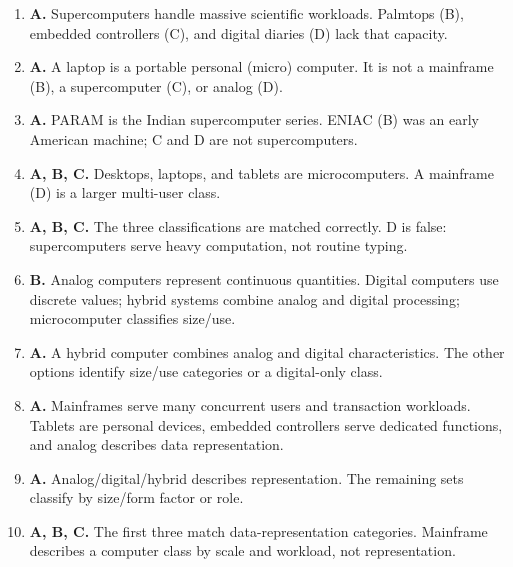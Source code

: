 \begin{enumerate}[label=\textbf{Q\arabic*.}, leftmargin=*]
\item \textbf{A.} Supercomputers handle massive scientific workloads. Palmtops (B), embedded controllers (C), and digital diaries (D) lack that capacity.
\item \textbf{A.} A laptop is a portable personal (micro) computer. It is not a mainframe (B), a supercomputer (C), or analog (D).
\item \textbf{A.} PARAM is the Indian supercomputer series. ENIAC (B) was an early American machine; C and D are not supercomputers.
\item \textbf{A, B, C.} Desktops, laptops, and tablets are microcomputers. A mainframe (D) is a larger multi-user class.
\item \textbf{A, B, C.} The three classifications are matched correctly. D is false: supercomputers serve heavy computation, not routine typing.
\item \textbf{B.} Analog computers represent continuous quantities. Digital computers use discrete values; hybrid systems combine analog and digital processing; microcomputer classifies size/use.

\item \textbf{A.} A hybrid computer combines analog and digital characteristics. The other options identify size/use categories or a digital-only class.

\item \textbf{A.} Mainframes serve many concurrent users and transaction workloads. Tablets are personal devices, embedded controllers serve dedicated functions, and analog describes data representation.

\item \textbf{A.} Analog/digital/hybrid describes representation. The remaining sets classify by size/form factor or role.

\item \textbf{A, B, C.} The first three match data-representation categories. Mainframe describes a computer class by scale and workload, not representation.

\end{enumerate}
